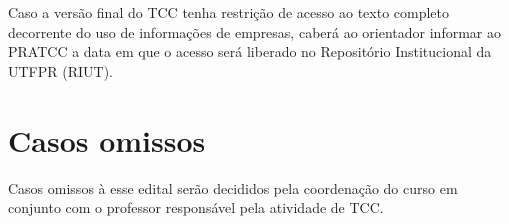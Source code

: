 \documentclass[a4paper, 12pt]{article}
\begin{document}
	Caso a versão final do TCC tenha restrição de acesso ao texto completo decorrente do uso de informações de empresas, caberá ao orientador informar ao PRATCC a data em que o acesso será liberado no Repositório Institucional da UTFPR (RIUT).
	
	
	\section{Casos omissos}
	
	Casos omissos à esse edital serão decididos pela coordenação do curso em conjunto com o professor responsável pela atividade de TCC.
\end{document}
